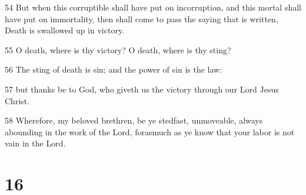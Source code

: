 \par 54 But when this corruptible shall have put on incorruption, and this mortal shall have put on immortality, then shall come to pass the saying that is written, Death is swallowed up in victory.
\par 55 O death, where is thy victory? O death, where is thy sting?
\par 56 The sting of death is sin; and the power of sin is the law:
\par 57 but thanks be to God, who giveth us the victory through our Lord Jesus Christ.
\par 58 Wherefore, my beloved brethren, be ye stedfast, unmoveable, always abounding in the work of the Lord, forasmuch as ye know that your labor is not vain in the Lord.

\chapter{16}

